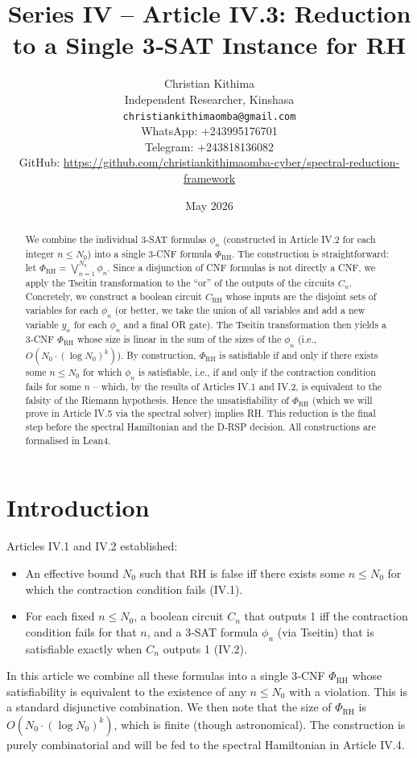 \documentclass[11pt,a4paper]{article}
\title{Series IV – Article IV.3: Reduction to a Single 3‑SAT Instance for RH}
\author{Christian Kithima \\
Independent Researcher, Kinshasa \\
\texttt{christiankithimaomba@gmail.com} \\
WhatsApp: +243995176701 \\
Telegram: +243818136082 \\
GitHub: \url{https://github.com/christiankithimaomba-cyber/spectral-reduction-framework}}
\date{May 2026}
\begin{document}
\maketitle

\begin{abstract}
We combine the individual 3‑SAT formulas \(\phi_n\) (constructed in Article IV.2 for each integer \(n \le N_0\)) into a single 3‑CNF formula \(\Phi_{\text{RH}}\). The construction is straightforward: let \(\Phi_{\text{RH}} = \bigvee_{n=1}^{N_0} \phi_n\). Since a disjunction of CNF formulas is not directly a CNF, we apply the Tseitin transformation to the “or” of the outputs of the circuits \(C_n\). Concretely, we construct a boolean circuit \(C_{\text{RH}}\) whose inputs are the disjoint sets of variables for each \(\phi_n\) (or better, we take the union of all variables and add a new variable \(y_n\) for each \(\phi_n\) and a final OR gate). The Tseitin transformation then yields a 3‑CNF \(\Phi_{\text{RH}}\) whose size is linear in the sum of the sizes of the \(\phi_n\) (i.e., \(O(N_0 \cdot (\log N_0)^k)\)). By construction, \(\Phi_{\text{RH}}\) is satisfiable if and only if there exists some \(n \le N_0\) for which \(\phi_n\) is satisfiable, i.e., if and only if the contraction condition fails for some \(n\) – which, by the results of Articles IV.1 and IV.2, is equivalent to the falsity of the Riemann hypothesis. Hence the unsatisfiability of \(\Phi_{\text{RH}}\) (which we will prove in Article IV.5 via the spectral solver) implies RH. This reduction is the final step before the spectral Hamiltonian and the D‑RSP decision. All constructions are formalised in Lean4.
\end{abstract}

\tableofcontents

\section{Introduction}

Articles IV.1 and IV.2 established:
\begin{itemize}
\item An effective bound \(N_0\) such that RH is false iff there exists some \(n \le N_0\) for which the contraction condition fails (IV.1).
\item For each fixed \(n \le N_0\), a boolean circuit \(C_n\) that outputs 1 iff the contraction condition fails for that \(n\), and a 3‑SAT formula \(\phi_n\) (via Tseitin) that is satisfiable exactly when \(C_n\) outputs 1 (IV.2).
\end{itemize}
In this article we combine all these formulas into a single 3‑CNF \(\Phi_{\text{RH}}\) whose satisfiability is equivalent to the existence of any \(n \le N_0\) with a violation. This is a standard disjunctive combination. We then note that the size of \(\Phi_{\text{RH}}\) is \(O(N_0 \cdot (\log N_0)^k)\), which is finite (though astronomical). The construction is purely combinatorial and will be fed to the spectral Hamiltonian in Article IV.4.
\end{document}
